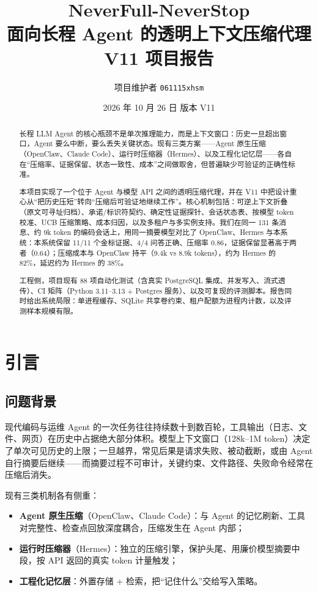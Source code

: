 \documentclass[11pt,a4paper]{ctexart}
\title{\bfseries NeverFull-NeverStop\\[4pt]
\large 面向长程 Agent 的透明上下文压缩代理\\[2pt]
\normalsize V11 项目报告}
\author{项目维护者 \quad \texttt{061115xhsm}}
\date{2026 年 10 月 26 日 \quad 版本 V11}
\begin{document}
\maketitle

\begin{abstract}
长程 LLM Agent 的核心瓶颈不是单次推理能力，而是上下文窗口：历史一旦超出窗口，Agent 要么中断，要么丢失关键状态。现有三类方案——Agent 原生压缩（OpenClaw、Claude Code）、运行时压缩器（Hermes）、以及工程化记忆层——各自在“压缩率、证据保留、状态一致性、成本”之间做取舍，但普遍缺少可验证的正确性标准。

本项目实现了一个位于 Agent 与模型 API 之间的透明压缩代理，并在 V11 中把设计重心从“把历史压短”转向“压缩后可验证地继续工作”。核心机制包括：可逆上下文折叠（原文可寻址归档）、承诺/标识符契约、确定性证据探针、会话状态表、按模型 token 校准、UCB 压缩策略、成本归因，以及多租户与多实例支持。我们在同一 131 条消息、约 9k token 的编码会话上，用同一摘要模型对比了 OpenClaw、Hermes 与本系统：本系统保留 11/11 个金标证据、4/4 问答正确、压缩率 0.86，证据保留显著高于两者（0.64）；压缩成本与 OpenClaw 持平（9.4k vs 8.9k tokens），约为 Hermes 的 82\%，延迟约为 Hermes 的 38\%。

工程侧，项目现有 88 项自动化测试（含真实 PostgreSQL 集成、并发写入、流式透传）、CI 矩阵（Python 3.11--3.13 + Postgres 服务）、以及可复现的评测脚本。报告同时给出系统局限：单进程缓存、SQLite 共享卷约束、租户配额为进程内计数，以及评测样本规模有限。
\end{abstract}

\tableofcontents
\newpage

\section{引言}

\subsection{问题背景}
现代编码与运维 Agent 的一次任务往往持续数十到数百轮，工具输出（日志、文件、网页）在历史中占据绝大部分体积。模型上下文窗口（128k--1M token）决定了单次可见历史的上限；一旦越界，常见后果是请求失败、被动截断，或由 Agent 自行摘要后继续——而摘要过程不可审计，关键约束、文件路径、失败命令经常在压缩后消失。

现有三类机制各有侧重：
\begin{itemize}
  \item \textbf{Agent 原生压缩}（OpenClaw、Claude Code）：与 Agent 的记忆刷新、工具对完整性、检查点回放深度耦合，压缩发生在 Agent 内部；
  \item \textbf{运行时压缩器}（Hermes）：独立的压缩引擎，保护头尾、用廉价模型摘要中段，按 API 返回的真实 token 计量触发；
  \item \textbf{工程化记忆层}：外置存储 + 检索，把“记住什么”交给写入策略。
\end{itemize}
\end{document}
